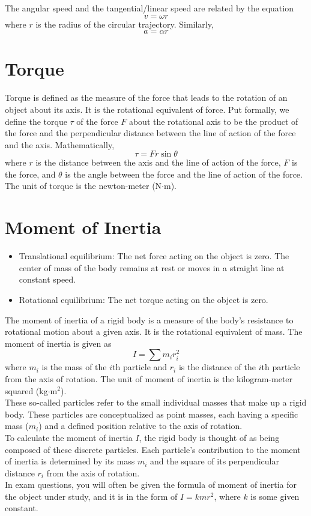 \documentclass[a4paper,12pt]{article}
\let\oldsection\section
\renewcommand\section{\clearpage\oldsection}
\newcommand{\lb}{\\[8pt]}
\begin{document}
The angular speed and the tangential/linear speed are related by the equation $$v = \omega r$$where $r$ is the radius of the circular trajectory. Similarly, $$a = \alpha r$$

\section{Torque}

Torque is defined as the measure of the force that leads to the rotation of an object about its axis. It is the rotational equivalent of force. Put formally, we define the torque $\tau$ of the force $F$ about the rotational axis to be the product of the force and the perpendicular distance between the line of action of
the force and the axis. Mathematically, $$\tau = Fr\sin\theta$$where $r$ is the distance between the axis and the line of action of the force, $F$ is the force, and $\theta$ is the angle between the force and the line of action of the force. The unit of torque is the newton-meter (N$\cdot$m).

\section{Moment of Inertia}

\begin{itemize}
  \item Translational equilibrium: The net force acting on the object is zero. The center of mass of the body remains at rest or moves in a straight line at constant speed.
  \item Rotational equilibrium: The net torque acting on the object is zero.
\end{itemize}

The moment of inertia of a rigid body is a measure of the body's resistance to rotational motion about a given axis. It is the rotational equivalent of mass. The moment of inertia is given as $$I = \sum m_ir_i^2$$where $m_i$ is the mass of the $i$th particle and $r_i$ is the distance of the $i$th particle from the axis of rotation. The unit of moment of inertia is the kilogram-meter squared (kg$\cdot$m$^2$).\lb
These so-called particles refer to the small individual masses that make up a rigid body. These particles are conceptualized as point masses, each having a specific mass ($m_i$) and a defined position relative to the axis of rotation.\lb
To calculate the moment of inertia $I$, the rigid body is thought of as being composed of these discrete particles. Each particle's contribution to the moment of inertia is determined by its mass $m_i$ and the square of its perpendicular distance $r_i$ from the axis of rotation.\lb
In exam questions, you will often be given the formula of moment of inertia for the object under study, and it is in the form of $I = kmr^2$, where $k$ is some given constant.
\end{document}
